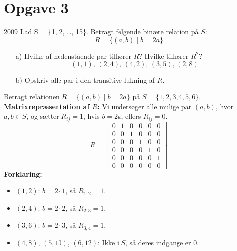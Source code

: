 \documentclass{article}
\begin{document}
\section*{Opgave 3} 2009
Lad S = \{1, 2, \ldots, 15\}. 
Betragt følgende binære relation på \( S \):
\[
R = \{(a, b) \mid b = 2a\}
\]
\begin{enumerate}
    \item[a)] Hvilke af nedenstående par tilhører \( R \)? Hvilke tilhører \( R^2 \)?
    \[
    (1, 1), \, (2, 4), \, (4, 2), \, (3, 5), \, (2, 8)
    \]
    \item[b)] Opskriv alle par i den transitive lukning af \( R \).
\end{enumerate}
Betragt relationen \( R = \{(a, b) \mid b = 2a\} \) på \( S = \{1, 2, 3, 4, 5, 6\} \).
\textbf{Matrixrepræsentation af \( R \):}
Vi undersøger alle mulige par \((a, b)\), hvor \( a, b \in S \), og sætter \( R_{ij} = 1 \), hvis \( b = 2a \), ellers \( R_{ij} = 0 \).
\[ 
R =
\begin{bmatrix}
0 & 1 & 0 & 0 & 0 & 0 \\ 
0 & 0 & 1 & 0 & 0 & 0 \\ 
0 & 0 & 0 & 1 & 0 & 0 \\ 
0 & 0 & 0 & 0 & 1 & 0 \\ 
0 & 0 & 0 & 0 & 0 & 1 \\ 
0 & 0 & 0 & 0 & 0 & 0
\end{bmatrix}
\]
\textbf{Forklaring:}
\begin{itemize}
    \item \((1, 2)\): \( b = 2 \cdot 1 \), så \( R_{1,2} = 1 \).
    \item \((2, 4)\): \( b = 2 \cdot 2 \), så \( R_{2,3} = 1 \).
    \item \((3, 6)\): \( b = 2 \cdot 3 \), så \( R_{3,4} = 1 \).
    \item \((4, 8)\), \((5, 10)\), \((6, 12)\): Ikke i \( S \), så deres indgange er 0.
\end{itemize}

\thispagestyle{empty}
\newpage
\setcounter{page}{1}
\end{document}
